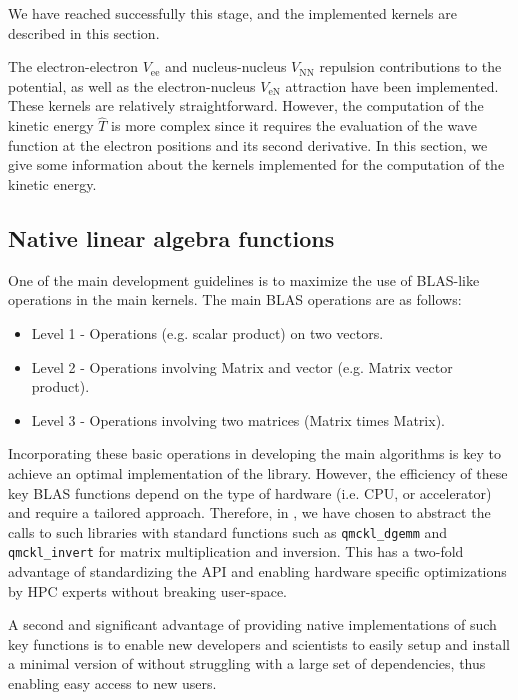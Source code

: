 We have reached successfully this stage, and the implemented kernels are
described in this section.

The electron-electron $V_{\text{ee}}$ and nucleus-nucleus $V_{\text{NN}}$
repulsion contributions to the potential, as well as the electron-nucleus
$V_{\text{eN}}$ attraction have been implemented. These kernels are relatively
straightforward. However, the computation of the kinetic energy $\hat{T}$ is
more complex since it requires the evaluation of the wave function at the
electron positions and its second derivative. In this section, we give some
information about the kernels implemented for the computation of the kinetic
energy.

\subsection{Native linear algebra functions}

One of the main development guidelines is to maximize the use
of \ac{BLAS}-like operations in the main kernels. The main \ac{BLAS} operations are
as follows:

\begin{itemize}
\item Level 1 - Operations (e.g. scalar product) on two vectors.
\item Level 2 - Operations involving Matrix and vector (e.g. Matrix vector product).
\item Level 3 - Operations involving two matrices (Matrix times Matrix).
\end{itemize}

Incorporating these basic operations in developing the main algorithms is key to
achieve an optimal implementation of the library. However, the efficiency of these key \ac{BLAS}
functions depend on the type of hardware (i.e. CPU, or accelerator) and require a
tailored approach. Therefore, in \QMCkl{}, we have chosen to abstract the
calls to such libraries with standard \QMCkl{} functions such as
\texttt{qmckl_dgemm} and \texttt{qmckl_invert} for matrix
multiplication and inversion. This has a two-fold advantage of standardizing
the \ac{API} and enabling hardware specific optimizations by \ac{HPC} experts
without breaking user-space.

A second and significant advantage of providing native implementations of
such key functions is to enable new developers and scientists to easily
setup and install a minimal version of \QMCkl{} without struggling with
a large set of dependencies, thus enabling easy access to new users.

